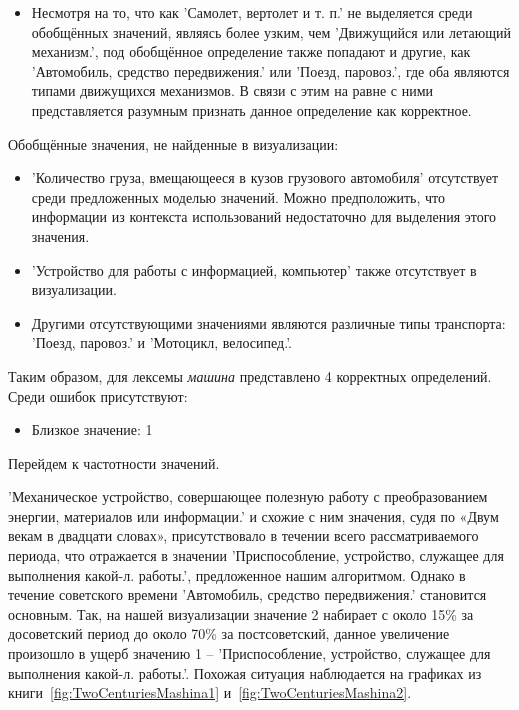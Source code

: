 \begin{itemize}
    \item Несмотря на то, что как ’Самолет, вертолет и т. п.’ не выделяется среди
обобщённых значений, являясь более узким, чем ’Движущийся или летающий механизм.’,
под обобщённое определение также попадают и другие, как ’Автомобиль, средство передвижения.’
или ’Поезд, паровоз.’, где оба являются типами движущихся механизмов.
В связи с этим на равне с ними представляется разумным признать данное определение как корректное.

\end{itemize}

Обобщённые значения, не найденные в визуализации:
\begin{itemize}
    \item ’Количество груза, вмещающееся в кузов грузового автомобиля’ отсутствует среди предложенных моделью значений.
Можно предположить, что информации из контекста использований недостаточно для выделения этого значения.

    \item ’Устройство для работы с информацией, компьютер’ также отсутствует в визуализации.

    \item Другими отсутствующими значениями являются различные типы транспорта:
’Поезд, паровоз.’ и ’Мотоцикл, велосипед.’.   %
\end{itemize}

Таким образом, для лексемы \textit{машина} представлено 4 корректных определений.
Среди ошибок присутствуют:
\begin{itemize}
    \item Близкое значение: 1
\end{itemize}

Перейдем к частотности значений.

’Механическое устройство, совершающее полезную работу с преобразованием энергии,
материалов или информации.’ и схожие с ним значения, судя по «Двум векам в двадцати словах»,
присутствовало в течении всего рассматриваемого периода, что отражается в значении
’Приспособление, устройство, служащее для выполнения какой-л. работы.’, предложенное
нашим алгоритмом.
Однако в течение советского времени ’Автомобиль, средство передвижения.’ становится основным.
Так, на нашей визуализации значение 2 набирает с около 15\% за досоветский период
до около 70\% за постсоветский, данное увеличение произошло в ущерб значению 1 –
’Приспособление, устройство, служащее для выполнения какой-л. работы.’.
Похожая ситуация наблюдается на графиках из книги~\ref{fig:TwoCenturiesMashina1} и~\ref{fig:TwoCenturiesMashina2}.

